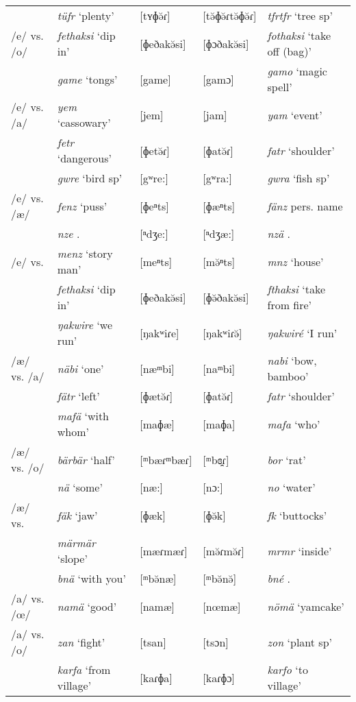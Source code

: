 \begin{longtable} {lllll}
				&\emph{tüfr} `plenty'&[tʏɸə̆ɾ]&[tə̆ɸə̆ɾtə̆ɸə̆ɾ]&\emph{tfrtfr} `tree sp'\\
	/e/ vs. /o/	&\emph{fethaksi} `dip in'&[ɸeðakə̆si]&[ɸɔðakə̆si]&\emph{fothaksi} `take off (bag)'\\
				&\emph{game} `tongs'&[{\ᵑ}game]&[{\ᵑ}gamɔ]&\emph{gamo} `magic spell'\\
	/e/ vs. /a/	&\emph{yem} `cassowary'&[jem]&[jam]&\emph{yam} `event'\\
				&\emph{fetr} `dangerous'&[ɸetə̆ɾ]&[ɸatə̆ɾ]&\emph{fatr} `shoulder'\\
				&\emph{gwre} `bird sp'&[{\ᵑ}gʷre:]&[{\ᵑ}gʷra:]&\emph{gwra} `fish sp'\\
	/e/ vs. /æ/	&\emph{fenz} `puss'&[ɸeⁿts]&[ɸæⁿts]&\emph{fänz} pers. name\\
				&\emph{nze} \Fsg.\Erg&[ⁿdʒe:]&[ⁿdʒæ:]&\emph{nzä} \Fsg.\Abs\\
	/e/ vs. \Zero{}&\emph{menz} `story man'&[meⁿts]&[mə̆ⁿts]&\emph{mnz} `house'\\
				&\emph{fethaksi} `dip in'&[ɸeðakə̆si]&[ɸə̆ðakə̆si]&\emph{fthaksi} `take from fire'\\
				&\emph{ŋakwire} `we run'&[ŋakʷiɾe]&[ŋakʷiɾə̆]&\emph{ŋakwiré} `I run'\\
	/æ/ vs. /a/	&\emph{näbi} `one'&[næᵐbi]&[naᵐbi]&\emph{nabi} `bow, bamboo'\\
				&\emph{fätr} `left'&[ɸætə̆ɾ]&[ɸatə̆ɾ]&\emph{fatr} `shoulder'\\
				&\emph{mafä} `with whom'&[maɸæ]&[maɸa]&\emph{mafa} `who'\\
	/æ/ vs. /o/ &\emph{bärbär} `half'&[ᵐbæɾᵐbæɾ]&[ᵐbɞ̯ɾ]&\emph{bor} `rat'\\
				&\emph{nä} `some'&[næ:]&[nɔ:]&\emph{no} `water'\\
	/æ/ vs. \Zero{}&\emph{fäk} `jaw'&[ɸæk]&[ɸə̆k]&\emph{fk} `buttocks'\\
				&\emph{märmär} `slope'&[mæɾmæɾ]&[mə̆ɾmə̆ɾ]&\emph{mrmr} `inside'\\
				&\emph{bnä} `with you'&[ᵐbə̆næ]&[ᵐbə̆nə̆]&\emph{bné} \Snsg.{\Erg}\\
	/a/ vs. /œ/ &\emph{namä} `good'&[namæ]&[nœmæ]&\emph{nömä} `yamcake'\\
	/a/ vs. /o/ &\emph{zan} `fight'&[tsan]&[tsɔn]&\emph{zon} `plant sp'\\
				&\emph{karfa} `from village'&[kaɾɸa]&[kaɾɸɔ]&\emph{karfo} `to village'\\

\end{longtable}
